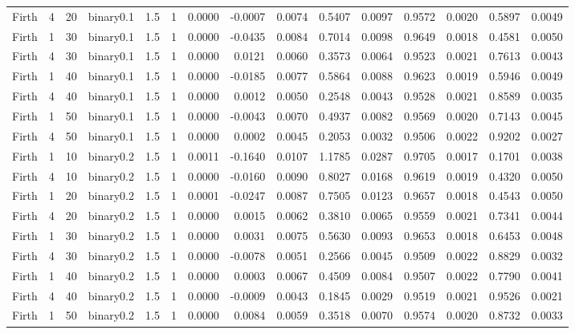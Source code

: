 \begin{longtable}{rrrrrrrrrrrrrrr}
  Firth & 4 & 20 & binary0.1 & 1.5 & 1 & 0.0000 & -0.0007 & 0.0074 & 0.5407 & 0.0097 & 0.9572 & 0.0020 & 0.5897 & 0.0049 \\ 
  Firth & 1 & 30 & binary0.1 & 1.5 & 1 & 0.0000 & -0.0435 & 0.0084 & 0.7014 & 0.0098 & 0.9649 & 0.0018 & 0.4581 & 0.0050 \\ 
  Firth & 4 & 30 & binary0.1 & 1.5 & 1 & 0.0000 & 0.0121 & 0.0060 & 0.3573 & 0.0064 & 0.9523 & 0.0021 & 0.7613 & 0.0043 \\ 
  Firth & 1 & 40 & binary0.1 & 1.5 & 1 & 0.0000 & -0.0185 & 0.0077 & 0.5864 & 0.0088 & 0.9623 & 0.0019 & 0.5946 & 0.0049 \\ 
  Firth & 4 & 40 & binary0.1 & 1.5 & 1 & 0.0000 & 0.0012 & 0.0050 & 0.2548 & 0.0043 & 0.9528 & 0.0021 & 0.8589 & 0.0035 \\ 
  Firth & 1 & 50 & binary0.1 & 1.5 & 1 & 0.0000 & -0.0043 & 0.0070 & 0.4937 & 0.0082 & 0.9569 & 0.0020 & 0.7143 & 0.0045 \\ 
  Firth & 4 & 50 & binary0.1 & 1.5 & 1 & 0.0000 & 0.0002 & 0.0045 & 0.2053 & 0.0032 & 0.9506 & 0.0022 & 0.9202 & 0.0027 \\ 
  Firth & 1 & 10 & binary0.2 & 1.5 & 1 & 0.0011 & -0.1640 & 0.0107 & 1.1785 & 0.0287 & 0.9705 & 0.0017 & 0.1701 & 0.0038 \\ 
  Firth & 4 & 10 & binary0.2 & 1.5 & 1 & 0.0000 & -0.0160 & 0.0090 & 0.8027 & 0.0168 & 0.9619 & 0.0019 & 0.4320 & 0.0050 \\ 
  Firth & 1 & 20 & binary0.2 & 1.5 & 1 & 0.0001 & -0.0247 & 0.0087 & 0.7505 & 0.0123 & 0.9657 & 0.0018 & 0.4543 & 0.0050 \\ 
  Firth & 4 & 20 & binary0.2 & 1.5 & 1 & 0.0000 & 0.0015 & 0.0062 & 0.3810 & 0.0065 & 0.9559 & 0.0021 & 0.7341 & 0.0044 \\ 
  Firth & 1 & 30 & binary0.2 & 1.5 & 1 & 0.0000 & 0.0031 & 0.0075 & 0.5630 & 0.0093 & 0.9653 & 0.0018 & 0.6453 & 0.0048 \\ 
  Firth & 4 & 30 & binary0.2 & 1.5 & 1 & 0.0000 & -0.0078 & 0.0051 & 0.2566 & 0.0045 & 0.9509 & 0.0022 & 0.8829 & 0.0032 \\ 
  Firth & 1 & 40 & binary0.2 & 1.5 & 1 & 0.0000 & 0.0003 & 0.0067 & 0.4509 & 0.0084 & 0.9507 & 0.0022 & 0.7790 & 0.0041 \\ 
  Firth & 4 & 40 & binary0.2 & 1.5 & 1 & 0.0000 & -0.0009 & 0.0043 & 0.1845 & 0.0029 & 0.9519 & 0.0021 & 0.9526 & 0.0021 \\ 
  Firth & 1 & 50 & binary0.2 & 1.5 & 1 & 0.0000 & 0.0084 & 0.0059 & 0.3518 & 0.0070 & 0.9574 & 0.0020 & 0.8732 & 0.0033 \\ 

\end{longtable}
